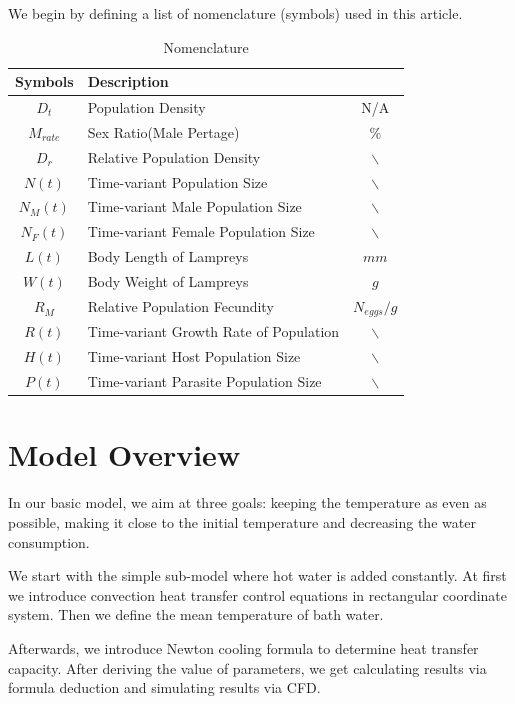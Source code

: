 \documentclass{mcmthesis}
\begin{document}
We begin by defining a list of nomenclature (symbols) used in this article.
 \begin{table}[h]
 	\begin{center}
 		\caption{Nomenclature}
 		\vspace{0.1cm}
 		\begin{tabular}{cm{10cm}<{\centering}c}
 			\toprule
 			{\bf Symbols} & {\bf Description} & \quad {\bf Unit} \\ \midrule
 			$D_t$&Population Density&N/A\\
 			$M_{rate}$&Sex Ratio(Male Pertage)&$\%$\\
 			$D_r$&Relative Population Density&$\backslash$\\
 			$N(t)$&Time-variant Population Size&$\backslash$\\
 			$N_M(t)$&Time-variant Male Population Size&$\backslash$\\
 			$N_F(t)$&Time-variant Female Population Size&$\backslash$\\
 			$L(t)$&Body Length of Lampreys&$mm$\\
 			$W(t)$&Body Weight of Lampreys&$g$\\
 			$R_M$&Relative Population Fecundity&$N_{eggs}/g$\\
 			$R(t)$&Time-variant Growth Rate of Population&$\backslash$\\
 			$H(t)$&Time-variant Host Population Size&$\backslash$\\
 			$P(t)$&Time-variant Parasite Population Size&$\backslash$\\\bottomrule
 		\end{tabular}
 	\end{center}
 \end{table}


\section{Model Overview}

In our basic model, we aim at three goals: keeping the temperature as even as possible, making it close to the initial temperature and decreasing the water consumption.

We start with the simple sub-model where hot water is added constantly.
At first we introduce convection heat transfer control equations in rectangular coordinate system. Then we define the mean temperature of bath water.

Afterwards, we introduce Newton cooling formula to determine heat transfer
capacity. After deriving the value of parameters, we get calculating results via formula deduction and simulating results via CFD.
\end{document}
